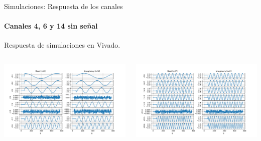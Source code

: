 \documentclass[ignorenonframetext,12pt]{beamer}
\begin{document}
				\begin{frame}{Simulaciones: Respuesta de los canales}
								\framesubtitle{Canales 4, 6 y 14 sin señal}
								Respuesta de simulaciones en Vivado.
								\begin{columns}
												\begin{column}{0.5\textwidth}
												\includegraphics[width=1.2\textwidth]{gd_chann16_out_1_8}
								\end{column}
												\begin{column}{0.5\textwidth}
												\includegraphics[width=1.2\textwidth]{gd_chann16_out_9_16}
								\end{column}
								\end{columns}
				\end{frame}
\end{document}
